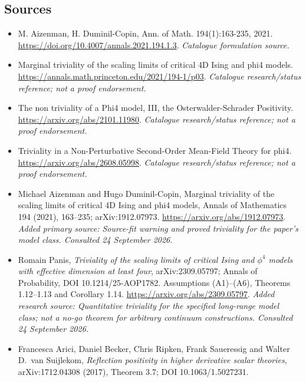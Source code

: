 \documentclass[11pt]{article}
\begin{document}
\subsection{Sources}
\begin{itemize}\raggedright
\item[\textnormal{[S1]}]\hypertarget{source:30006697:1}{} M. Aizenman, H. Duminil-Copin, Ann. of Math. 194(1):163-235, 2021.
\url{https://doi.org/10.4007/annals.2021.194.1.3}.
{\small\textit{Catalogue formulation source.}}
\item[\textnormal{[S2]}]\hypertarget{source:30006697:2}{} Marginal triviality of the scaling limits of critical 4D Ising and phi4 models.
\url{https://annals.math.princeton.edu/2021/194-1/p03}.
{\small\textit{Catalogue research/status reference; not a proof endorsement.}}
\item[\textnormal{[S3]}]\hypertarget{source:30006697:3}{} The non triviality of a Phi4 model, III, the Osterwalder-Schrader Positivity.
\url{https://arxiv.org/abs/2101.11980}.
{\small\textit{Catalogue research/status reference; not a proof endorsement.}}
\item[\textnormal{[S4]}]\hypertarget{source:30006697:4}{} Triviality in a Non-Perturbative Second-Order Mean-Field Theory for phi4.
\url{https://arxiv.org/abs/2608.05998}.
{\small\textit{Catalogue research/status reference; not a proof endorsement.}}
\item[\textnormal{[E1]}]\hypertarget{extra:30006697:1}{} Michael Aizenman and Hugo Duminil-Copin, Marginal triviality of the scaling limits of critical 4D Ising and phi4 models, Annals of Mathematics 194 (2021), 163--235; arXiv:1912.07973.
\url{https://arxiv.org/abs/1912.07973}.
{\small\textit{Added primary source: Source-fit warning and proved triviality for the paper's model class. Consulted 24 September 2026.}}
\item[\textnormal{[E2]}]\hypertarget{extra:30006697:2}{} Romain Panis, \emph{Triviality of the scaling limits of critical Ising and $\phi^4$ models with effective dimension at least four}, arXiv:2309.05797; Annals of Probability, DOI 10.1214/25-AOP1782. Assumptions (A1)--(A6), Theorems 1.12--1.13 and Corollary 1.14.
\url{https://arxiv.org/abs/2309.05797}.
{\small\textit{Added research source: Quantitative triviality for the specified long-range model class; not a no-go theorem for arbitrary continuum constructions. Consulted 24 September 2026.}}
\item[\textnormal{[E3]}]\hypertarget{extra:30006697:3}{} Francesca Arici, Daniel Becker, Chris Ripken, Frank Saueressig and Walter D.\ van Suijlekom, \emph{Reflection positivity in higher derivative scalar theories}, arXiv:1712.04308 (2017), Theorem 3.7; DOI 10.1063/1.5027231.

\end{itemize}
\end{document}
